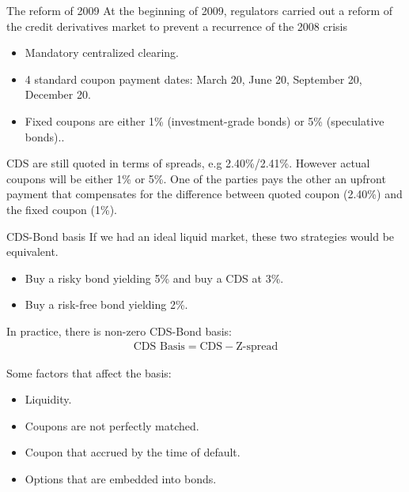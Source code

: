 \documentclass{beamer}
\begin{document}
\begin{frame}{The reform of 2009}
\justify
At the beginning of 2009, regulators carried out a reform of the credit derivatives market to prevent a recurrence of the 2008 crisis

\begin{itemize}
\justifying
\item Mandatory centralized clearing.
\item 4 standard coupon payment dates: March 20, June 20, September 20, December 20.
\item Fixed coupons are either 1\% (investment-grade bonds) or 5\% (speculative bonds)..
\end{itemize}

\justify
CDS are still quoted in terms of spreads, e.g 2.40\%/2.41\%. However actual coupons will be either 1\% or 5\%. One of the parties pays the other an upfront payment that compensates for the difference between quoted coupon (2.40\%) and the fixed coupon (1\%).

\end{frame}



\begin{frame}{CDS-Bond basis}
\justify
If we had an ideal liquid market, these two strategies would be equivalent.
\begin{itemize}
\justifying
\item Buy a risky bond yielding 5\% and buy a CDS at 3\%.
\item Buy a risk-free bond yielding 2\%.
\end{itemize}

\justify
In practice, there is non-zero CDS-Bond basis:
\begin{align*}
\text{CDS Basis} = \text{CDS} - \text{Z-spread}
\end{align*}

\justify
Some factors that affect the basis:
\begin{itemize}
\justifying
\item Liquidity.
\item Coupons are not perfectly matched.
\item Coupon that accrued by the time of default.
\item Options that are embedded into bonds.
\end{itemize}
\end{frame}
\end{document}
